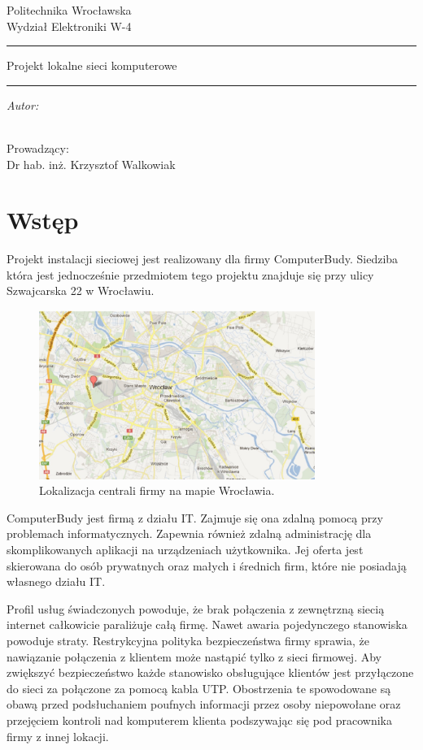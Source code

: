 \documentclass{report}
\author{Mateusz Socha 181308 \\ Janusz Kuszczyński 184872 }
\title{}
\makeatletter
\newcommand{\linia}{\rule{\linewidth}{0.4mm}}
\renewcommand{\maketitle}{\begin{titlepage}

    \vspace*{1cm}

    \begin{center}\small

    Politechnika Wrocławska\\

    Wydział Elektroniki W-4\\

    \end{center}

    \vspace{3cm}

    \noindent\linia

    \begin{center}

      \LARGE Projekt lokalne sieci komputerowe\\
      \normalsize\textsc{\@title}

         \end{center}

     \noindent\linia

    \vspace{0.5cm}

    \begin{flushright}

    \begin{minipage}{6cm}

    \textit{\small Autor:}\\

    \normalsize \textsc{\@author} \\

    \end{minipage}

    \vspace{5cm}

     {\small Prowadzący:}\\

         Dr hab. inż. Krzysztof Walkowiak

     \end{flushright}

    \vspace*{\stretch{6}}

    \begin{center}

    \@date

    \end{center}

  \end{titlepage}

}
\makeatother
\begin{document}
\maketitle
\tableofcontents

\chapter{Wstęp}

\vspace{0,5cm}
Projekt instalacji sieciowej jest realizowany dla firmy ComputerBudy. Siedziba która jest jednocześnie przedmiotem tego projektu znajduje się
przy ulicy Szwajcarska 22 w Wrocławiu.

\begin{figure}[h!]
  \centering
      \includegraphics[width=0.8\textwidth]{./obrazki/adres_computerbudy.jpeg}
  \caption{Lokalizacja centrali firmy na mapie Wrocławia.}
\end{figure}

ComputerBudy jest firmą z działu IT. Zajmuje się ona zdalną pomocą przy problemach informatycznych. Zapewnia również zdalną administrację dla
skomplikowanych aplikacji na urządzeniach użytkownika. Jej oferta jest skierowana do osób prywatnych oraz małych i średnich firm, które
nie posiadają własnego działu IT.

Profil usług świadczonych powoduje, że brak połączenia z zewnętrzną siecią internet całkowicie paraliżuje całą firmę. 
Nawet awaria pojedynczego stanowiska powoduje straty. Restrykcyjna polityka bezpieczeństwa firmy sprawia, że nawiązanie połączenia z klientem
może nastąpić tylko z sieci firmowej. Aby zwiększyć bezpieczeństwo każde stanowisko obsługujące klientów jest przyłączone do sieci
za połączone za pomocą kabla UTP. Obostrzenia te spowodowane są obawą przed podsłuchaniem poufnych informacji przez osoby niepowołane oraz
przejęciem kontroli nad komputerem klienta podszywając się pod pracownika firmy z innej lokacji.
\end{document}
